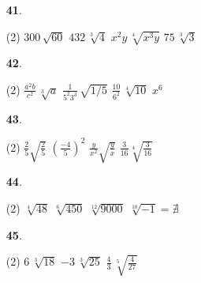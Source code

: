\documentclass[a4paper, pdf, twoside]{book}
\begin{document}
\begin{multicols}{2}
\begin{enumerate}

 \item[\fontfamily{phv}\selectfont\color{blue}\textbf{41}. ] 
 \begin{tasks}[column-sep=1em, item-indent=1.3333em](2)
	 \task $300\,\sqrt {60}$
	 \task $432\,\sqrt [3]{4}$
	 \task $x^2 y\,\sqrt [4]{x^3 y}$
	 \task $75\,\sqrt [3]{3}$
\end{tasks}
\vspace{0.25cm}



 \item[\fontfamily{phv}\selectfont\color{blue}\textbf{42}. ] 
 \begin{tasks}[column-sep=1em, item-indent=1.3333em](2)
	 \task* $\frac {a^2 b}{c^2}\,\sqrt [3]{a}$
	 \task* $\frac {1}{5^2 3^3}\,\sqrt {1/5}$
	 \task* $\frac {10}{6^2}\,\sqrt [4]{10}$
	 \task $x^6$
\end{tasks}
\vspace{0.25cm}



 \item[\fontfamily{phv}\selectfont\color{blue}\textbf{43}. ] 
 \begin{tasks}[column-sep=1em, item-indent=1.3333em](2)
	 \task $\frac {2}{5} \sqrt {\frac {2}{5} } $
	 \task $\left (\frac {-4}{5} \right )^2$
	 \task $\frac {y}{x^2} \sqrt { \frac {y}{x}}$
	 \task $\frac {3}{16} \sqrt [4]{\frac {3}{16}}$
\end{tasks}
\vspace{0.25cm}



 \item[\fontfamily{phv}\selectfont\color{blue}\textbf{44}. ] 
 \begin{tasks}[column-sep=1em, item-indent=1.3333em](2)
	 \task $\sqrt [4]{48}$
	 \task $\sqrt [6]{450}$
	 \task $\sqrt [12]{9000}$
	 \task $\sqrt [10]{-1}=\nexists $
\end{tasks}
\vspace{0.25cm}



 \item[\fontfamily{phv}\selectfont\color{blue}\textbf{45}. ] 
 \begin{tasks}[column-sep=1em, item-indent=1.3333em](2)
	 \task $6\,\sqrt [3]{18}$
	 \task $-3\,\sqrt [3]{25}$
	 \task* $\frac {4}{3}\,\sqrt [5]{\frac {4}{27}}$
\end{tasks}
 \end{enumerate}
\vspace{0.3cm}


\end{multicols}
\end{document}
